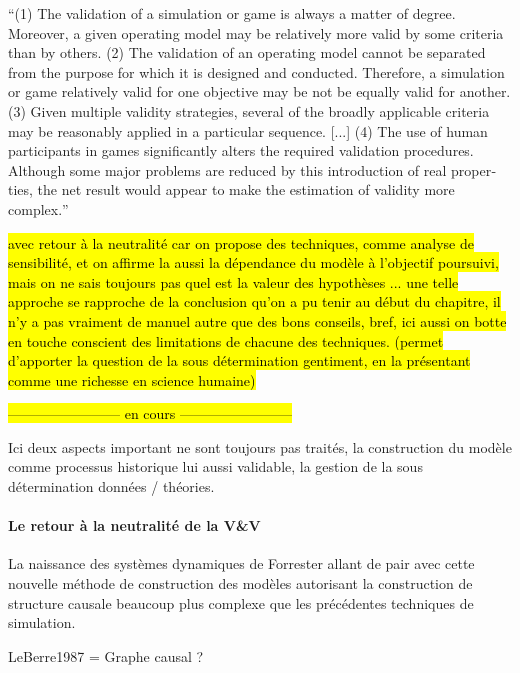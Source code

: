 \foreignquote{english}{(1) The validation of a simulation or game is always a matter of degree. Moreover, a given operating model may be relatively more valid by some criteria than by others. (2) The validation of an operating model cannot be separated from the purpose for which it is designed and conducted. Therefore, a simulation or game relatively valid for one objective may be not be equally valid for another. (3) Given multiple validity strategies, several of the broadly applicable criteria may be reasonably applied in a particular sequence. [...] (4) The use of human participants in games significantly alters the required validation procedures. Although some major problems are reduced by this introduction of real properties, the net result would appear to make the estimation of validity more complex.} \textcite{Hermann1967}


\hl{ avec retour à la neutralité car on propose des techniques, comme analyse de sensibilité, et on affirme la aussi la dépendance du modèle à l'objectif poursuivi, mais on ne sais toujours pas quel est la valeur des hypothèses ... une telle approche se rapproche de la conclusion qu'on a pu tenir au début du chapitre, il n'y a pas vraiment de manuel autre que des bons conseils, bref, ici aussi on botte en touche conscient des limitations de chacune des techniques. (permet d'apporter la question de la sous détermination gentiment, en la présentant comme une richesse en science humaine)}

\hl{------------------------ en cours ------------------------}

Ici deux aspects important ne sont toujours pas traités, la construction du modèle comme processus historique lui aussi validable, la gestion de la sous détermination données / théories.


\paragraph{Le retour à la neutralité de la V\&V}



La naissance des systèmes dynamiques de Forrester allant de pair avec cette nouvelle méthode de construction des modèles autorisant la construction de structure causale beaucoup plus complexe que les précédentes techniques de simulation.

LeBerre1987 = Graphe causal ?

